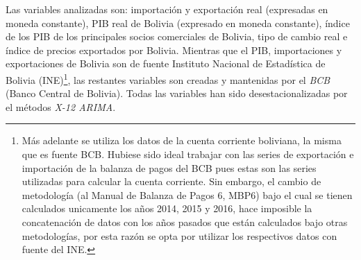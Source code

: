 \documentclass[12pt,letterpaper]{article}
\begin{document}
Las variables analizadas son: importación y exportación real (expresadas en moneda constante), PIB real de Bolivia (expresado en moneda constante), índice de los PIB de los principales socios comerciales de Bolivia, tipo de cambio real e índice de precios exportados por Bolivia. Mientras que el PIB, importaciones y exportaciones de Bolivia son de fuente Instituto Nacional de Estadística de Bolivia (INE)\footnote{Más adelante se utiliza los datos de la cuenta corriente boliviana, la misma que es fuente BCB. Hubiese sido ideal trabajar con las series de exportación e importación de la balanza de pagos del BCB pues estas son las series utilizadas para calcular la cuenta corriente. Sin embargo, el cambio de metodología (al Manual de Balanza de Pagos 6, MBP6) bajo el cual se tienen calculados unicamente los años 2014, 2015 y 2016, hace imposible la concatenación de datos con los años pasados que están calculados bajo otras metodologías, por esta razón se opta por utilizar los respectivos datos con fuente del INE.}, las restantes variables son creadas y mantenidas por el \emph{BCB} (Banco Central de Bolivia). Todas las variables han sido desestacionalizadas por el métodos \emph{X-12 ARIMA}.
\end{document}
